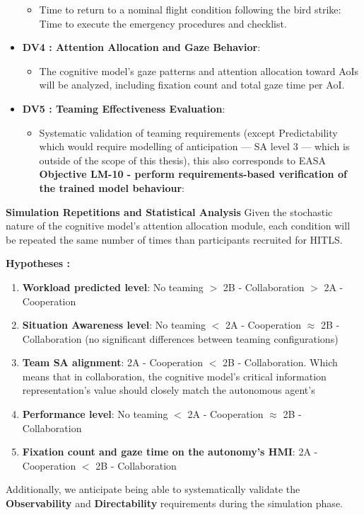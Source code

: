 \documentclass[12pt,a4paper]{article} %
\begin{document}
\begin{itemize}
		\begin{itemize}
			\item Time to return to a nominal flight condition following the bird strike: Time to execute the emergency procedures and checklist.
		\end{itemize}
		\item \textbf{DV4 : Attention Allocation and Gaze Behavior}:
		\begin{itemize}
			\item The cognitive model's gaze patterns and attention allocation toward AoIs will be analyzed, including fixation count and total gaze time per AoI.
		\end{itemize}
		\item \textbf{DV5 : Teaming Effectiveness Evaluation}:
		\begin{itemize}
			\item Systematic validation of teaming requirements (except Predictability which would require modelling of anticipation --- SA level 3 --- which is outside of the scope of this thesis), this also corresponds to EASA \textbf{Objective LM-10 - perform requirements-based verification of the trained model behaviour}:
		\end{itemize}
	\end{itemize}
	
	\textbf{Simulation Repetitions and Statistical Analysis}
	Given the stochastic nature of the cognitive model's attention allocation module, each condition will be repeated the same number of times than participants recruited for HITLS.

	\textbf{Hypotheses :}
	\begin{enumerate}[label=\textbf{H\arabic* :}]
	\label{hypotheses}
	\item \textbf{Workload predicted level}: No teaming $>$ 2B - Collaboration $>$ 2A - Cooperation
	\item \textbf{Situation Awareness level}: No teaming $<$ 2A - Cooperation $\approx$ 2B - Collaboration (no significant differences between teaming configurations)
	\item \textbf{Team SA alignment}: 2A - Cooperation $<$ 2B - Collaboration. Which means that in collaboration, the cognitive model's critical information representation's value should closely match the autonomous agent's
	\item \textbf{Performance level}: No teaming $<$ 2A - Cooperation $\approx$ 2B - Collaboration
	\item \textbf{Fixation count and gaze time on the autonomy's HMI}: 2A - Cooperation $<$ 2B - Collaboration
	\end{enumerate}
	Additionally, we anticipate being able to systematically validate the \textbf{Observability} and \textbf{Directability} requirements during the simulation phase.
	
\end{document}
